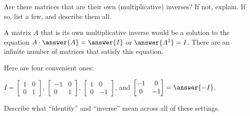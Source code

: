 \documentclass[space,nooutcomes]{ximera}
\begin{document}
\begin{question}
Are there matrices that are their own (multiplicative) inverses?  If not, explain.  If so, list a few, and describe them all.
\begin{solution}
A matrix $A$ that is its own multiplicative inverse would be a solution to the equation $A\cdot \answer{A}=\answer{I}$ or $\answer{A^2}=I$.  There are an infinite number of matrices that satisfy this equation.  
\begin{question}
Here are four convenient ones: 

$I=\begin{bmatrix} 1&0 \\ 0&1 \end{bmatrix}$, $\begin{bmatrix} -1&0 \\ 0&1 \end{bmatrix}$, $\begin{bmatrix} 1&0 \\ 0&-1 \end{bmatrix}$, and $\begin{bmatrix} -1&0 \\ 0&-1 \end{bmatrix}=\answer{-I}$. 
\end{question}
\end{solution}
\end{question}

\begin{question}
Describe what ``identity'' and ``inverse'' mean across all of these settings.  
\begin{freeResponse}
\end{freeResponse}
\end{question}
\end{document}
